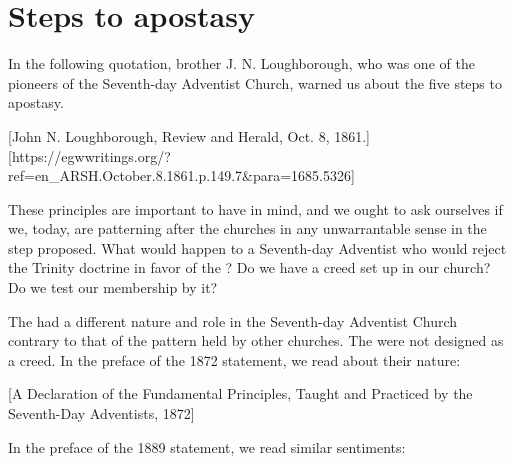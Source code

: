 \chapter{Steps to apostasy}

In the following quotation, brother J. N. Loughborough, who was one of the pioneers of the Seventh-day Adventist Church, warned us about the five steps to apostasy.

[John N. Loughborough, Review and Herald, Oct. 8, 1861.][https://egwwritings.org/?ref=en\_ARSH.October.8.1861.p.149.7&para=1685.5326]

These principles are important to have in mind, and we ought to ask ourselves if we, today, are patterning after the churches in any unwarrantable sense in the step proposed. What would happen to a Seventh-day Adventist who would reject the Trinity doctrine in favor of the ? Do we have a creed set up in our church? Do we test our membership by it?

The  had a different nature and role in the Seventh-day Adventist Church contrary to that of the pattern held by other churches. The  were not designed as a creed. In the preface of the 1872 statement, we read about their nature:

[A Declaration of the Fundamental Principles, Taught and Practiced by the Seventh-Day Adventists, 1872]

In the preface of the 1889 statement, we read similar sentiments:

